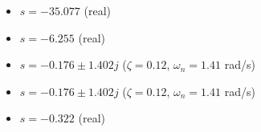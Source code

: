 \begin{itemize}
    \item $s = -35.077$ (real)
    \item $s = -6.255$ (real)
    \item $s = -0.176 \pm 1.402j$ ($\zeta=0.12$, $\omega_n=1.41$ rad/s)
    \item $s = -0.176 \pm 1.402j$ ($\zeta=0.12$, $\omega_n=1.41$ rad/s)
    \item $s = -0.322$ (real)
\end{itemize}
